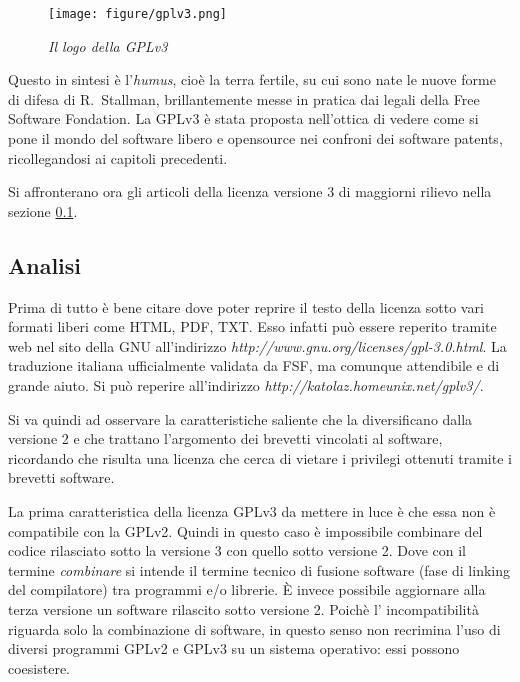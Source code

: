 \begin{figure}[b]
	\begin{center}
		\texttt{[image: figure/gplv3.png]}
	\end{center}
	\caption{\textit{Il logo della GPLv3}}
\end{figure}

Questo in sintesi è l'\textit{humus}, cioè la terra fertile, su cui sono nate le nuove forme di difesa di R.~Stallman, brillantemente messe in pratica dai legali della Free Software Fondation. La GPLv3 è stata proposta nell'ottica di vedere come si pone il mondo del software libero e opensource nei confroni dei software patents, ricollegandosi ai capitoli precedenti.

Si affronterano ora gli articoli della licenza versione 3 di maggiorni rilievo nella sezione \ref{sec:analisi-gpl3}.

\subsection{Analisi} \label{sec:analisi-gpl3}
Prima di tutto è bene citare dove poter reprire il testo della licenza sotto vari formati liberi come HTML, PDF, TXT. Esso infatti può essere reperito tramite web nel sito della GNU all'indirizzo \textit{http://www.gnu.org/licenses/gpl-3.0.html}. La traduzione italiana ufficialmente validata da FSF, ma comunque attendibile e di grande aiuto. Si può reperire all'indirizzo \textit{http://katolaz.homeunix.net/gplv3/}.

Si va quindi ad osservare la caratteristiche saliente che la diversificano dalla versione 2 e che trattano l'argomento dei brevetti vincolati al software, ricordando che risulta una licenza che cerca di vietare i privilegi ottenuti tramite i brevetti software.

La prima caratteristica della licenza GPLv3 da mettere in luce è che essa non è compatibile con la GPLv2. Quindi in questo caso è impossibile combinare del codice rilasciato sotto la versione 3 con quello sotto versione 2. Dove con il termine \textit{combinare} si intende il termine tecnico di fusione software (fase di linking del compilatore) tra programmi e/o librerie.  \`E invece possibile aggiornare alla terza versione un software rilascito sotto versione 2. Poichè l' incompatibilità riguarda solo la combinazione di software, in questo senso non recrimina l'uso di diversi programmi GPLv2 e GPLv3 su un sistema operativo: essi possono coesistere.

